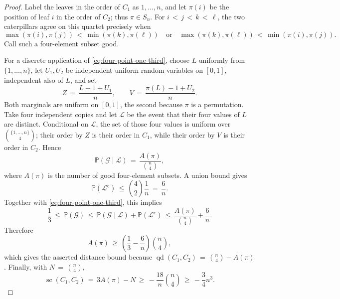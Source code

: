 \documentclass[10pt,a4paper]{amsart}
\newcommand{\qd}{\operatorname{qd}}
\newcommand{\score}{\operatorname{sc}}
\begin{document}
\begin{proof}
Label the leaves in the order of $C_1$ as $1,\ldots,n$, and let $\pi(i)$ be
the position of leaf $i$ in the order of $C_2$; thus
$\pi\in S_n$.  For $i\,<\,j\,<\,k\,<\,\ell$, the two caterpillars agree
on this quartet precisely when
\[
 \max(\pi(i),\pi(j))\,<\,\min(\pi(k),\pi(\ell))
 \quad\text{or}\quad
 \max(\pi(k),\pi(\ell))\,<\,\min(\pi(i),\pi(j)).
\]
Call such a four-element subset good.

For a discrete application of \eqref{eq:four-point-one-third}, choose
$L$ uniformly from $\{1,\ldots,n\}$, let $U_1,U_2$ be independent uniform
random variables on $[0,1]$, independent also of $L$, and set
\[
 Z\,=\,\frac{L-1+U_1}{n},
 \qquad
 V\,=\,\frac{\pi(L)-1+U_2}{n}.
\]
Both marginals are uniform on $[0,1]$, the second because $\pi$ is a
permutation.  Take four independent copies and let $\mathcal L$ be the event
that their four values of $L$ are distinct.  Conditional on $\mathcal L$, the
set of those four values is uniform over
$\binom{\{1,\ldots,n\}}4$; their order by $Z$ is their order in $C_1$, while
their order by $V$ is their order in $C_2$.  Hence
\[
 \mathbb P(\mathcal G\mid\mathcal L)
 \,=\,\frac{A(\pi)}{\binom n4},
\]
where $A(\pi)$ is the number of good four-element subsets.  A union bound gives
\[
 \mathbb P(\mathcal L^{\mathsf c})
 \,\leq\,\binom42\frac1n\,=\,\frac6n.
\]
Together with \eqref{eq:four-point-one-third}, this implies
\[
 \frac13
 \,\leq\,\mathbb P(\mathcal G)
 \,\leq\,\mathbb P(\mathcal G\mid\mathcal L)
       +\mathbb P(\mathcal L^{\mathsf c})
 \,\leq\,\frac{A(\pi)}{\binom n4}+\frac6n.
\]
Therefore
\[
 A(\pi)\,\geq\,\left(\frac13-\frac6n\right)\binom n4,
\]
which gives the asserted distance bound because
$\qd(C_1,C_2)\,=\,\binom n4-A(\pi)$.  Finally, with
$N\,=\,\binom n4$,
\[
 \score(C_1,C_2)
 \,=\,3A(\pi)-N
 \,\geq\,-\frac{18}{n}\binom n4
 \,\geq\,-\frac34n^3.
\]
\end{proof}
\end{document}

